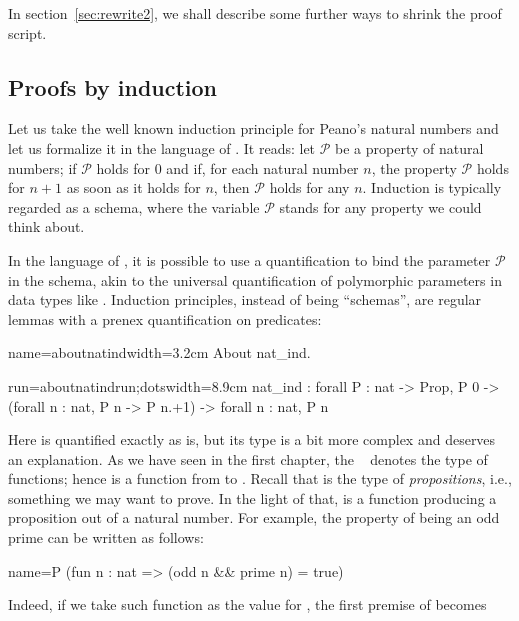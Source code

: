 In section~\ref{sec:rewrite2}, we shall describe some further
ways to shrink the proof script.

\subsection{Proofs by induction}\label{ssec:ind}

Let us take the well known induction principle for Peano's natural numbers
and let us formalize it in the language of \Coq{}.  It reads:
let $\mathcal{P}$ be a property of natural numbers; if
$\mathcal{P}$ holds for $0$ and if, for each natural number $n$, the
property
$\mathcal{P}$ holds for $n + 1$ as soon as it holds for $n$, then $\mathcal{P}$
holds for any $n$.  Induction is typically regarded as a schema, where
the variable $\mathcal{P}$ stands for any property we could think about.

In the language of \Coq{}, it is possible to use a quantification to
bind the parameter  $\mathcal{P}$ in the schema, akin to the universal
quantification of polymorphic parameters in data types like
. Induction principles, instead of being ``schemas'', are
regular lemmas with a prenex quantification on predicates:

\begin{coq-left}{name=aboutnatind}{width=3.2cm}
About nat_ind.
$~$
$~$
\end{coq-left}
\begin{coqout-right}{run=aboutnatindrun;dots}{width=8.9cm}
nat_ind : forall P : nat -> Prop,
  P 0 -> (forall n : nat, P n -> P n.+1) ->
  forall n : nat, P n
\end{coqout-right}

Here  is quantified exactly as  is, but its type is a bit more
complex and deserves an explanation.  As we have seen in the first
chapter, the ~\C{->} denotes the type of functions; hence  is a
function from  to .  Recall that  is the type
of \emph{propositions}, i.e., something we may want to prove.  In the
light of that,  is a function producing a proposition out of a natural
number.  For example, the property of being an odd prime can be written as
follows:

\begin{coq}{name=P}{}
(fun n : nat => (odd n && prime n) = true)
\end{coq}
Indeed, if we take such function as the value for , the first premise
of  becomes

